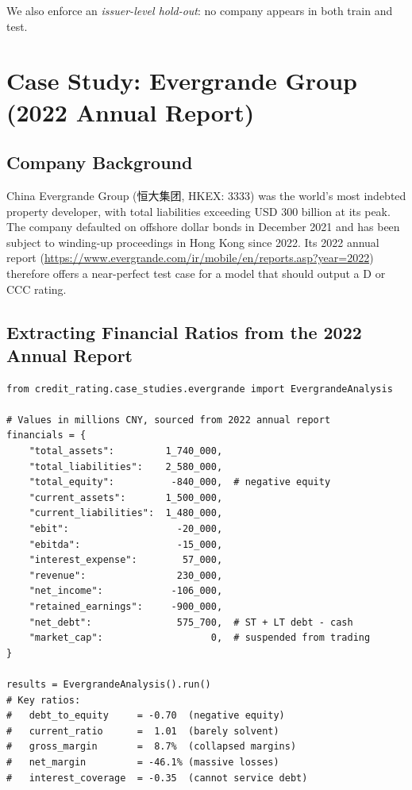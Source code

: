 \documentclass[12pt, a4paper]{article}
\begin{document}
\noindent We also enforce an \emph{issuer-level hold-out}: no company appears in both train and test.

\newpage

\section{Case Study: Evergrande Group (2022 Annual Report)}
\label{sec:evergrande}

\subsection{Company Background}

China Evergrande Group (恒大集团, HKEX: 3333) was the world's most indebted property developer, with total liabilities exceeding USD 300 billion at its peak.  The company defaulted on offshore dollar bonds in December 2021 and has been subject to winding-up proceedings in Hong Kong since 2022.  Its 2022 annual report (\url{https://www.evergrande.com/ir/mobile/en/reports.asp?year=2022}) therefore offers a near-perfect test case for a model that should output a D or CCC rating.

\subsection{Extracting Financial Ratios from the 2022 Annual Report}

\begin{lstlisting}[caption={Evergrande FY2022 financial data and ratio computation}, label=lst:evergrande]
from credit_rating.case_studies.evergrande import EvergrandeAnalysis

# Values in millions CNY, sourced from 2022 annual report
financials = {
    "total_assets":         1_740_000,
    "total_liabilities":    2_580_000,
    "total_equity":          -840_000,  # negative equity
    "current_assets":       1_500_000,
    "current_liabilities":  1_480_000,
    "ebit":                   -20_000,
    "ebitda":                 -15_000,
    "interest_expense":        57_000,
    "revenue":                230_000,
    "net_income":            -106_000,
    "retained_earnings":     -900_000,
    "net_debt":               575_700,  # ST + LT debt - cash
    "market_cap":                   0,  # suspended from trading
}

results = EvergrandeAnalysis().run()
# Key ratios:
#   debt_to_equity     = -0.70  (negative equity)
#   current_ratio      =  1.01  (barely solvent)
#   gross_margin       =  8.7%  (collapsed margins)
#   net_margin         = -46.1% (massive losses)
#   interest_coverage  = -0.35  (cannot service debt)
\end{lstlisting}
\end{document}

